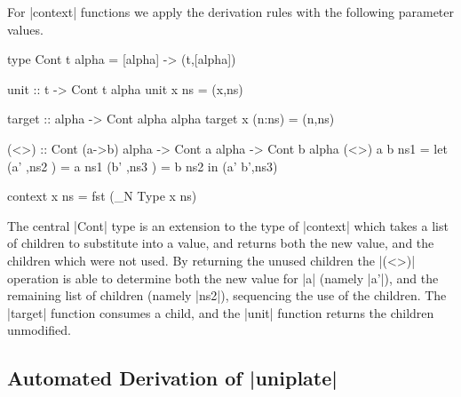 For |context| functions we apply the derivation rules with the following parameter values.

\begin{code}
type Cont t alpha = [alpha] -> (t,[alpha])

unit :: t -> Cont t alpha
unit x ns = (x,ns)

target :: alpha -> Cont alpha alpha
target x (n:ns) = (n,ns)

(<>) :: Cont (a->b) alpha -> Cont a alpha -> Cont b alpha
(<>) a b ns1 =  let  (a'  ,ns2  ) = a  ns1
                     (b'  ,ns3  ) = b  ns2
                in   (a' b',ns3)

context x ns = fst (_N \< Type \> \? x ns)
\end{code}

The central |Cont| type is an extension to the type of |context| which takes a list of children to substitute into a value, and returns both the new value, and the children which were not used. By returning the unused children the |(<>)| operation is able to determine both the new value for |a| (namely |a'|), and the remaining list of children (namely |ns2|), sequencing the use of the children. The |target| function consumes a child, and the |unit| function returns the children unmodified.

\begin{comment}
It is possible to improve the simplification opportunities and runtime speed by moving to continuation passing.
, by redefining if we use a continuation function to encode the pair.

\begin{code}
setChildren x ns = dExpr x ns const

type Cont t alpha r = [alpha] -> (t -> [alpha] -> r) -> r

unit :: t -> Cont t alpha r
unit    x  ns      c  = c x ns

target :: alpha -> Cont alpha alpha r
target  x  (n:ns)  c  = c n ns

(<>) :: Cont (a->b) alpha r -> Cont a alpha r -> Cont b alpha r
(<>) a b ns c =  a  ns $ \a'  ns ->
                 b  ns $ \b'  ns ->
                 c (a' b') ns
\end{code}
\end{comment}

\subsection{Automated Derivation of |uniplate|}

